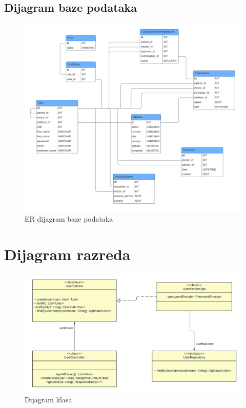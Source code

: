 		\subsection{Dijagram baze podataka}
		    \begin{figure}[H]
			     \includegraphics[width=\textwidth]{slike/DijagramBazePodataka.png} 
			     \caption{ER dijagram baze podataka} 
		    \end{figure}
		\eject
		
			
		\section{Dijagram razreda}
		
			
			\begin{figure}[H]
				\includegraphics[width=\textwidth]{slike/DijagramKlasa.png} 
				\caption{Dijagram klasa} 
		   \end{figure}

